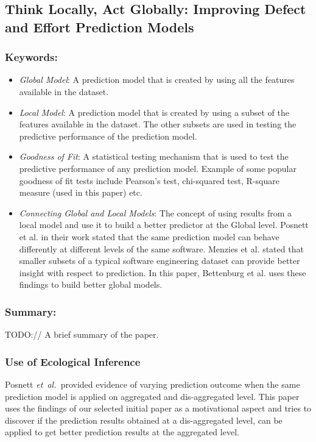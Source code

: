 \documentclass{sig-alternate-05-2015}
\newcommand{\etal}{\mbox{\emph{et al.\ }}}
\begin{document}
\subsection{Think Locally, Act Globally: Improving Defect and Effort Prediction Models \cite{Bettenburg:2012}}

\subsubsection{Keywords:}
\begin{itemize}
\item \emph{Global Model}: A prediction model that is created by using all the features available in the dataset.
\item \emph{Local Model}:  A prediction model that is created by using a subset of the features available in the dataset. The other subsets are used in testing the predictive performance of the prediction model.
\item \emph{Goodness of Fit}: A statistical testing mechanism that is used to test the predictive performance of any prediction model. Example of some popular goodness of fit tests include Pearson's test, chi-squared test, R-square measure (used in this paper) etc.
\item \emph{Connecting Global and Local Models}: The concept of using results from a local model and use it to build a better predictor at the Global level. Posnett et al. in their work \cite{Posnett:2011} stated that the same prediction model can behave differently at different levels of the same software. Menzies et al. \cite{Menzies:2011} stated that smaller subsets of a typical software engineering dataset can provide better insight with respect to prediction. In this paper, Bettenburg et al. uses these findings to build better global models.
\end{itemize} 

\subsubsection{Summary:}
TODO:// A brief summary of the paper.

\subsubsection{Use of Ecological Inference}
Posnett \etal provided evidence of varying prediction outcome when the same prediction model is applied on aggregated and dis-aggregated level. This paper uses the findings of our selected initial paper as a motivational aspect and tries to discover if the prediction results obtained at a dis-aggregated level, can be applied to get better prediction results at the aggregated level.
\end{document}

